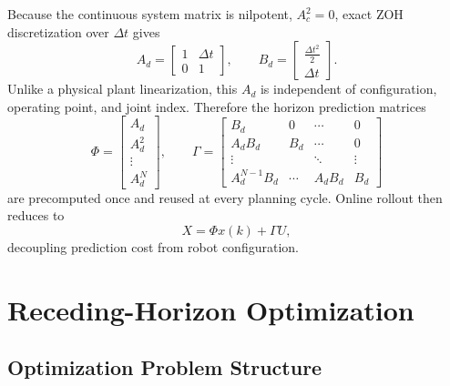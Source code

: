 Because the continuous system matrix is nilpotent, \(A_c^2=0\), exact
ZOH discretization over \(\Delta t\) gives
\begin{equation}
\label{eq:zoh}
A_d = \begin{bmatrix} 1 & \Delta t \\ 0 & 1 \end{bmatrix}, \qquad
B_d = \begin{bmatrix} \frac{\Delta t^2}{2} \\ \Delta t \end{bmatrix}.
\end{equation}
Unlike a physical plant linearization, this \(A_d\) is independent of
configuration, operating point, and joint index. Therefore the horizon
prediction matrices
\begin{equation}
\label{eq:prediction-matrices}
\Phi = \begin{bmatrix} A_d \\ A_d^2 \\ \vdots \\ A_d^N \end{bmatrix}, \qquad
\Gamma = \begin{bmatrix}
B_d & 0 & \cdots & 0 \\
A_d B_d & B_d & \cdots & 0 \\
\vdots & & \ddots & \vdots \\
A_d^{N-1} B_d & \cdots & A_d B_d & B_d
\end{bmatrix}
\end{equation}
are precomputed once and reused at every planning cycle. Online rollout
then reduces to
\begin{equation}
\label{eq:rollout}
X=\Phi x(k)+\Gamma U,
\end{equation}
decoupling prediction cost from robot configuration.

\section{Receding-Horizon Optimization}\label{iii.-receding-horizon-optimization-layer-2-qp-planner}

\subsection{Optimization Problem
Structure}\label{a.-optimization-problem-structure}

